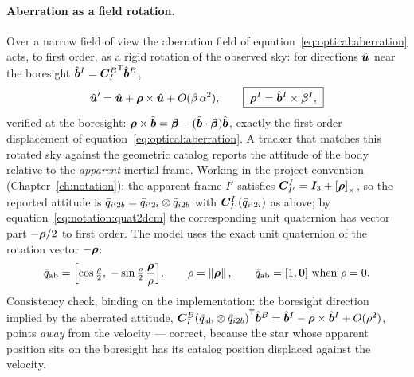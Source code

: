 \paragraph{Aberration as a field rotation.} Over a narrow field of view
the aberration field of equation~\eqref{eq:optical:aberration} acts, to
first order, as a rigid rotation of the observed sky: for directions
$\hat{\bm{u}}$ near the boresight $\hat{\bm{b}}^{I} =
{\bm{C}_{I}^{B}}^{\mathsf T}\hat{\bm{b}}^{B}$,
\begin{equation}
  \hat{\bm{u}}' = \hat{\bm{u}} + \bm{\rho} \times \hat{\bm{u}}
    + O(\beta\,\alpha^2),
  \qquad
  \boxed{\;
  \bm{\rho}^{I} = \hat{\bm{b}}^{I} \times \bm{\beta}^{I},
  \;}
  \label{eq:optical:rho}
\end{equation}
verified at the boresight: $\bm{\rho} \times \hat{\bm{b}} =
\bm{\beta} - (\hat{\bm{b}} \cdot \bm{\beta})\hat{\bm{b}}$, exactly the
first-order displacement of equation~\eqref{eq:optical:aberration}. A
tracker that matches this rotated sky against the geometric catalog
reports the attitude of the body relative to the \emph{apparent}
inertial frame. Working in the project convention
(Chapter~\ref{ch:notation}): the apparent frame $I'$ satisfies
$\bm{C}_{I'}^{I} = \bm{I}_3 + \left[\bm{\rho}\right]_{\times}$, so the reported attitude
is $\bar{q}_{i'2b} = \bar{q}_{i'2i} \otimes \bar{q}_{i2b}$ with
$\bm{C}_{I'}^{I}(\bar{q}_{i'2i})$ as above; by
equation~\eqref{eq:notation:quat2dcm} the corresponding unit quaternion
has vector part $-\bm{\rho}/2$ to first order. The model uses the exact
unit quaternion of the rotation vector $-\bm{\rho}$:
\begin{equation}
  \bar{q}_{\mathrm{ab}}
    = \Bigl[\cos\tfrac{\rho}{2},\;
        -\sin\tfrac{\rho}{2}\,\frac{\bm{\rho}}{\rho}\Bigr],
  \qquad \rho = \left\lVert \bm{\rho} \right\rVert,
  \qquad
  \bar{q}_{\mathrm{ab}} = [1, \bm{0}] \text{ when } \rho = 0 .
  \label{eq:optical:qab}
\end{equation}
Consistency check, binding on the implementation: the boresight
direction implied by the aberrated attitude,
${\bm{C}_{I}^{B}(\bar{q}_{\mathrm{ab}} \otimes
\bar{q}_{i2b})}^{\mathsf T} \hat{\bm{b}}^{B} = \hat{\bm{b}}^{I} -
\bm{\rho} \times \hat{\bm{b}}^{I} + O(\rho^2)$, points \emph{away} from
the velocity --- correct, because the star whose apparent position sits
on the boresight has its catalog position displaced against the
velocity.

